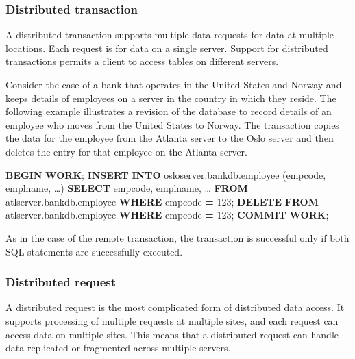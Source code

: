 \documentclass[
]{article}
\newenvironment{Shaded}{\begin{snugshade}}{\end{snugshade}}
\newcommand{\ControlFlowTok}[1]{\textcolor[rgb]{0.13,0.29,0.53}{\textbf{#1}}}
\newcommand{\DecValTok}[1]{\textcolor[rgb]{0.00,0.00,0.81}{#1}}
\newcommand{\KeywordTok}[1]{\textcolor[rgb]{0.13,0.29,0.53}{\textbf{#1}}}
\newcommand{\NormalTok}[1]{#1}
\newcommand{\OperatorTok}[1]{\textcolor[rgb]{0.81,0.36,0.00}{\textbf{#1}}}
\begin{document}
\hypertarget{distributed-transaction}{%
\subsubsection*{Distributed transaction}\label{distributed-transaction}}

A distributed transaction supports multiple data requests for data at
multiple locations. Each request is for data on a single server. Support
for distributed transactions permits a client to access tables on
different servers.

Consider the case of a bank that operates in the United States and
Norway and keeps details of employees on a server in the country in
which they reside. The following example illustrates a revision of the
database to record details of an employee who moves from the United
States to Norway. The transaction copies the data for the employee from
the Atlanta server to the Oslo server and then deletes the entry for
that employee on the Atlanta server.

\begin{Shaded}
\begin{Highlighting}[]
\ControlFlowTok{BEGIN} \KeywordTok{WORK}\NormalTok{;}
\KeywordTok{INSERT} \KeywordTok{INTO}\NormalTok{ osloserver.bankdb.employee}
\NormalTok{    (empcode, emplname, …)}
    \KeywordTok{SELECT}\NormalTok{ empcode, emplname, …}
        \KeywordTok{FROM}\NormalTok{ atlserver.bankdb.employee}
            \KeywordTok{WHERE}\NormalTok{ empcode }\OperatorTok{=} \DecValTok{123}\NormalTok{;}
\KeywordTok{DELETE} \KeywordTok{FROM}\NormalTok{ atlserver.bankdb.employee}
    \KeywordTok{WHERE}\NormalTok{ empcode }\OperatorTok{=} \DecValTok{123}\NormalTok{;}
\KeywordTok{COMMIT} \KeywordTok{WORK}\NormalTok{;}
\end{Highlighting}
\end{Shaded}

As in the case of the remote transaction, the transaction is successful
only if both SQL statements are successfully executed.

\hypertarget{distributed-request}{%
\subsubsection*{Distributed request}\label{distributed-request}}

A distributed request is the most complicated form of distributed data
access. It supports processing of multiple requests at multiple sites,
and each request can access data on multiple sites. This means that a
distributed request can handle data replicated or fragmented across
multiple servers.
\end{document}
